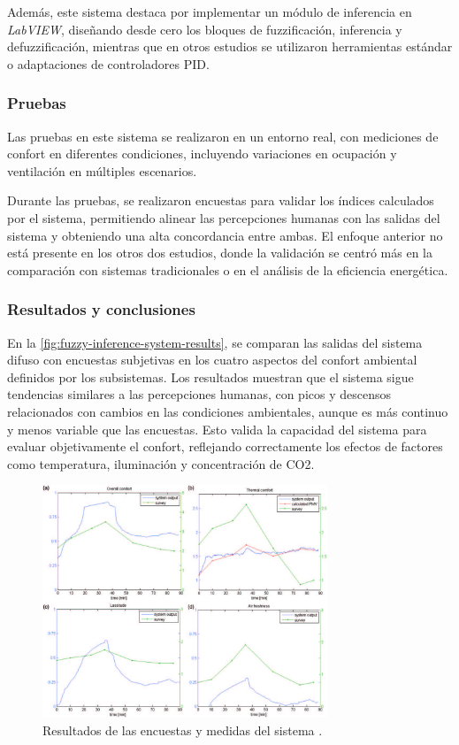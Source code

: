 Además, este sistema destaca por implementar un módulo de inferencia en \textit{LabVIEW}, diseñando desde cero los bloques de fuzzificación, inferencia y defuzzificación, mientras que en otros estudios se utilizaron herramientas estándar o adaptaciones de controladores PID.

\subsubsection{Pruebas}

Las pruebas en este sistema se realizaron en un entorno real, con mediciones de confort en diferentes condiciones, incluyendo variaciones en ocupación y ventilación en múltiples escenarios. 

Durante las pruebas, se realizaron encuestas para validar los índices calculados por el sistema, permitiendo alinear las percepciones humanas con las salidas del sistema y obteniendo una alta concordancia entre ambas. El enfoque anterior no está presente en los otros dos estudios, donde la validación se centró más en la comparación con sistemas tradicionales o en el análisis de la eficiencia energética.

\subsubsection{Resultados y conclusiones}

En la \autoref{fig:fuzzy-inference-system-results}, se comparan las salidas del sistema difuso con encuestas subjetivas en los cuatro aspectos del confort ambiental definidos por los subsistemas. Los resultados muestran que el sistema sigue tendencias similares a las percepciones humanas, con picos y descensos relacionados con cambios en las condiciones ambientales, aunque es más continuo y menos variable que las encuestas. Esto valida la capacidad del sistema para evaluar objetivamente el confort, reflejando correctamente los efectos de factores como temperatura, iluminación y concentración de CO2.

\begin{figure}[H]
	\centering
	\includegraphics[width=0.76\textwidth]{imgs/fuzzy-inference-system-results.JPG}
	\caption{Resultados de las encuestas y medidas del sistema \parencite{jablonski2018fuzzy}.}
	\label{fig:fuzzy-inference-system-results}
\end{figure}

